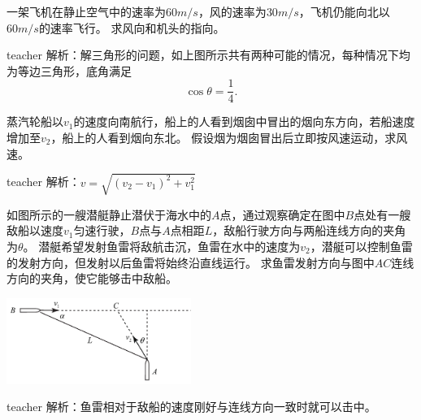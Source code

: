 \begin{example}
一架飞机在静止空气中的速率为$60\unit{m/s}$，风的速率为$30\unit{m/s}$，飞机仍能向北以$60\unit{m/s}$的速率飞行。
求风向和机头的指向。


\begin{taggedblock}{teacher}
\vspace*{4cm}
\noindent
解析：解三角形的问题，如上图所示共有两种可能的情况，每种情况下均为等边三角形，底角满足
\[
\cos\theta = \frac{1}{4}.
\]
\end{taggedblock}
\end{example}



\begin{example}
蒸汽轮船以$v_1$的速度向南航行，船上的人看到烟囱中冒出的烟向东方向，若船速度增加至$v_2$，船上的人看到烟向东北。
假设烟为烟囱冒出后立即按风速运动，求风速。

\begin{taggedblock}{teacher}
\vspace*{4cm}
\noindent
解析：$v=\sqrt{(v_2-v_1)^2+v_1^2}$
\end{taggedblock}
\end{example}

\begin{example}
如图所示的一艘潜艇静止潜伏于海水中的$A$点，通过观察确定在图中$B$点处有一艘敌船以速度$v_1$匀速行驶，$B$点与$A$点相距$L$，敌船行驶方向与两船连线方向的夹角为$\theta$。
潜艇希望发射鱼雷将敌航击沉，鱼雷在水中的速度为$v_2$，潜艇可以控制鱼雷的发射方向，但发射以后鱼雷将始终沿直线运行。
求鱼雷发射方向与图中$AC$连线方向的夹角，使它能够击中敌船。


\begin{flushright}
\includegraphics[width = 0.45\textwidth]{images/motion-46.pdf} 
\end{flushright}
\begin{taggedblock}{teacher}
\vspace*{5cm}
\noindent
解析：鱼雷相对于敌船的速度刚好与连线方向一致时就可以击中。
\end{taggedblock}
\end{example}



